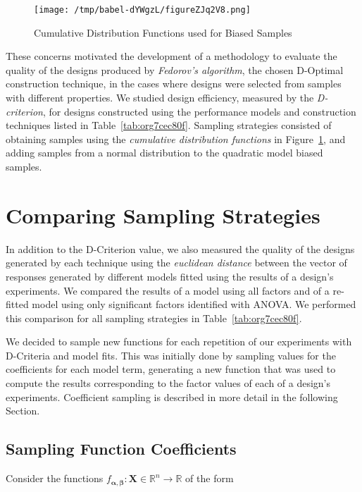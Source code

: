 \documentclass[11pt]{article}
\begin{document}
\begin{figure}[htbp]
\centering
\texttt{[image: /tmp/babel-dYWgzL/figureZJq2V8.png]}
\caption{\label{fig:orgc8a3415}
Cumulative Distribution Functions used for Biased Samples}
\end{figure}

These concerns motivated the development of a methodology to evaluate the
quality of the designs produced by  \emph{Fedorov's algorithm},
the chosen D-Optimal construction technique, in the cases where designs were
selected from samples with different properties. We studied design efficiency,
measured by the \emph{D-criterion}, for designs constructed using the performance
models and construction techniques listed in Table~\ref{tab:org7cec80f}.
Sampling strategies consisted of obtaining samples using the \emph{cumulative
distribution functions} in Figure~\ref{fig:orgc8a3415}, and adding samples from a
normal distribution to the quadratic model biased samples.

\section{Comparing Sampling Strategies}
\label{sec:orgbd10def}
In addition to the D-Criterion value, we also measured the quality of the
designs generated by each technique using the \emph{euclidean distance} between the
vector of responses generated by different models fitted using the results of a
design's experiments. We compared the results of a model using all factors and
of a re-fitted model using only significant factors identified with ANOVA. We
performed this comparison for all sampling strategies in
Table~\ref{tab:org7cec80f}.

We decided to sample new functions for each repetition of our experiments with
D-Criteria and model fits. This was initially done by sampling values for the
coefficients for each model term, generating a new function that was used to
compute the results corresponding to the factor values of each of a design's
experiments. Coefficient sampling is described in more detail in the following
Section.

\subsection{Sampling Function Coefficients}
\label{sec:orgb781adb}
Consider the functions
\(f_{\boldsymbol{\alpha},\boldsymbol{\beta}}\colon\mathbf{X}\in\mathbb{R}^n\to\mathbb{R}\)
of the form
\end{document}
